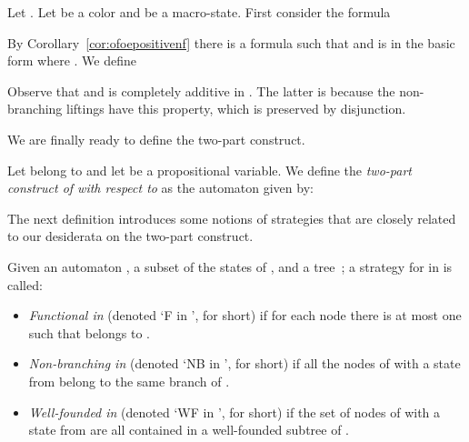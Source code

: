 \begin{definition}\label{def:bigpsi}
Let . Let  be a color and  be a macro-state. First consider the formula

By Corollary~\ref{cor:ofoepositivenf} there is a formula  such that  and  is in the basic form  where
.
We define

Observe that  and  is completely additive in . The latter is because the non-branching liftings have this property, which is preserved by disjunction.
\end{definition}

\noindent
We are finally ready to define the two-part construct.

\begin{definition}\label{def:fc2}
Let  belong to  and let  be a propositional variable. We define the \emph{two-part construct of  with respect to } as the automaton  given by:

\end{definition}

The next definition introduces some notions of strategies that are closely related to our desiderata on the two-part construct.

\begin{definition}\label{def:StratfunctionalFinitary}
Given an automaton , a subset  of the states of , and a tree~; a strategy  for \eloise in  is called:
\begin{itemize}
	\itemsep 0pt
\item \emph{Functional in } (denoted `F in ', for short) if for each node  there is at most one  such that  belongs to .
\item \emph{Non-branching in } (denoted `NB in ', for short) if all the nodes of  with a state from  belong to the same branch of .
\item \emph{Well-founded in } (denoted `WF in ', for short) if the set of nodes of  with a state from  are all contained in a well-founded subtree of .
\end{itemize}
\end{definition}





